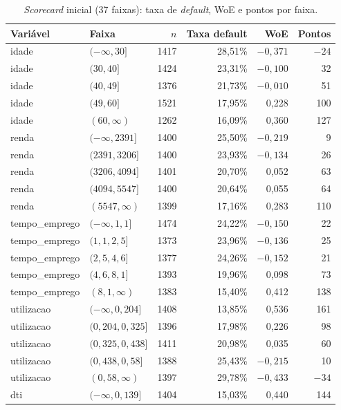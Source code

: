 \documentclass[11pt,a4paper]{article}
\begin{document}
\begin{table}[H]
\centering\footnotesize
\caption{\emph{Scorecard} inicial (37 faixas): taxa de \emph{default}, WoE e pontos por faixa.}
\label{tab:scorecard0}
\begin{tabular}{llrrrr}
\toprule
Variável & Faixa & $n$ & Taxa default & WoE & Pontos \\
\midrule
idade & $(-\infty, 30]$ & 1417 & 28,51\% & $-0{,}371$ & $-24$ \\
idade & $(30, 40]$ & 1424 & 23,31\% & $-0{,}100$ & 32 \\
idade & $(40, 49]$ & 1376 & 21,73\% & $-0{,}010$ & 51 \\
idade & $(49, 60]$ & 1521 & 17,95\% & 0,228 & 100 \\
idade & $(60, \infty)$ & 1262 & 16,09\% & 0,360 & 127 \\
\addlinespace
renda & $(-\infty, 2391]$ & 1400 & 25,50\% & $-0{,}219$ & 9 \\
renda & $(2391, 3206]$ & 1400 & 23,93\% & $-0{,}134$ & 26 \\
renda & $(3206, 4094]$ & 1401 & 20,70\% & 0,052 & 63 \\
renda & $(4094, 5547]$ & 1400 & 20,64\% & 0,055 & 64 \\
renda & $(5547, \infty)$ & 1399 & 17,16\% & 0,283 & 110 \\
\addlinespace
tempo\_emprego & $(-\infty, 1{,}1]$ & 1474 & 24,22\% & $-0{,}150$ & 22 \\
tempo\_emprego & $(1{,}1, 2{,}5]$ & 1373 & 23,96\% & $-0{,}136$ & 25 \\
tempo\_emprego & $(2{,}5, 4{,}6]$ & 1377 & 24,26\% & $-0{,}152$ & 21 \\
tempo\_emprego & $(4{,}6, 8{,}1]$ & 1393 & 19,96\% & 0,098 & 73 \\
tempo\_emprego & $(8{,}1, \infty)$ & 1383 & 15,40\% & 0,412 & 138 \\
\addlinespace
utilizacao & $(-\infty, 0{,}204]$ & 1408 & 13,85\% & 0,536 & 161 \\
utilizacao & $(0{,}204, 0{,}325]$ & 1396 & 17,98\% & 0,226 & 98 \\
utilizacao & $(0{,}325, 0{,}438]$ & 1411 & 20,98\% & 0,035 & 60 \\
utilizacao & $(0{,}438, 0{,}58]$ & 1388 & 25,43\% & $-0{,}215$ & 10 \\
utilizacao & $(0{,}58, \infty)$ & 1397 & 29,78\% & $-0{,}433$ & $-34$ \\
\addlinespace
dti & $(-\infty, 0{,}139]$ & 1404 & 15,03\% & 0,440 & 144 \\

\end{tabular}
\end{table}
\end{document}
